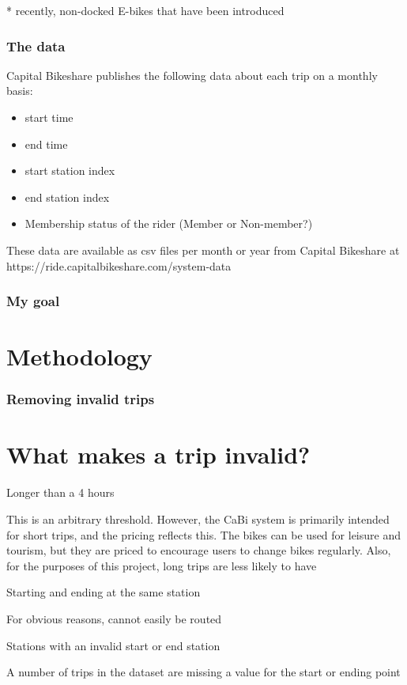 \documentclass{beamer}
\begin{document}
\begin{frame}
\begin{columns}
    \end{columns}
    \small{* recently, non-docked E-bikes that have been introduced}
\end{frame}

\begin{frame}
    \frametitle{The data}

    Capital Bikeshare publishes the following data about each trip on a monthly basis:

    \begin{itemize}
        \item start time
        \item end time
        \item start station index
        \item end station index
        \item Membership status of the rider (Member or Non-member?)
    \end{itemize}

    These data are available as csv files per month or year from Capital Bikeshare at https://ride.capitalbikeshare.com/system-data
\end{frame}

\begin{frame}
    \frametitle{My goal}


\end{frame}

\section{Methodology}
\begin{frame}
    \frametitle{Removing invalid trips}
    \section{What makes a trip invalid?}

    Longer than a 4 hours

    This is an arbitrary threshold. However, the CaBi system is primarily intended for short trips, and the pricing reflects this. The bikes can be used for leisure and tourism, but they are priced to encourage users to change bikes regularly. Also, for the purposes of this project, long trips are less likely to have


    Starting and ending at the same station

    For obvious reasons, cannot easily be routed

    Stations with an invalid start or end station

    A number of trips in the dataset are missing a value for the start or ending point

\end{frame}
\end{document}
